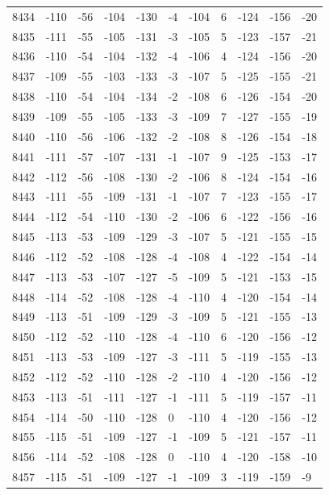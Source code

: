 \begin{table}[H]
\begin{tabular}{lllllllllll}
8434 & -110 & -56 & -104 & -130 & -4 & -104 & 6 & -124 & -156 & -20 \\
8435 & -111 & -55 & -105 & -131 & -3 & -105 & 5 & -123 & -157 & -21 \\
8436 & -110 & -54 & -104 & -132 & -4 & -106 & 4 & -124 & -156 & -20 \\
8437 & -109 & -55 & -103 & -133 & -3 & -107 & 5 & -125 & -155 & -21 \\
8438 & -110 & -54 & -104 & -134 & -2 & -108 & 6 & -126 & -154 & -20 \\
8439 & -109 & -55 & -105 & -133 & -3 & -109 & 7 & -127 & -155 & -19 \\
8440 & -110 & -56 & -106 & -132 & -2 & -108 & 8 & -126 & -154 & -18 \\
8441 & -111 & -57 & -107 & -131 & -1 & -107 & 9 & -125 & -153 & -17 \\
8442 & -112 & -56 & -108 & -130 & -2 & -106 & 8 & -124 & -154 & -16 \\
8443 & -111 & -55 & -109 & -131 & -1 & -107 & 7 & -123 & -155 & -17 \\
8444 & -112 & -54 & -110 & -130 & -2 & -106 & 6 & -122 & -156 & -16 \\
8445 & -113 & -53 & -109 & -129 & -3 & -107 & 5 & -121 & -155 & -15 \\
8446 & -112 & -52 & -108 & -128 & -4 & -108 & 4 & -122 & -154 & -14 \\
8447 & -113 & -53 & -107 & -127 & -5 & -109 & 5 & -121 & -153 & -15 \\
8448 & -114 & -52 & -108 & -128 & -4 & -110 & 4 & -120 & -154 & -14 \\
8449 & -113 & -51 & -109 & -129 & -3 & -109 & 5 & -121 & -155 & -13 \\
8450 & -112 & -52 & -110 & -128 & -4 & -110 & 6 & -120 & -156 & -12 \\
8451 & -113 & -53 & -109 & -127 & -3 & -111 & 5 & -119 & -155 & -13 \\
8452 & -112 & -52 & -110 & -128 & -2 & -110 & 4 & -120 & -156 & -12 \\
8453 & -113 & -51 & -111 & -127 & -1 & -111 & 5 & -119 & -157 & -11 \\
8454 & -114 & -50 & -110 & -128 & 0 & -110 & 4 & -120 & -156 & -12 \\
8455 & -115 & -51 & -109 & -127 & -1 & -109 & 5 & -121 & -157 & -11 \\
8456 & -114 & -52 & -108 & -128 & 0 & -110 & 4 & -120 & -158 & -10 \\
8457 & -115 & -51 & -109 & -127 & -1 & -109 & 3 & -119 & -159 & -9 \\

\end{tabular}
\end{table}
